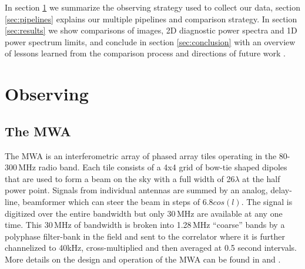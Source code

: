 \documentclass[twolcolumn,iop]{emulateapj}
\begin{document}




In section \ref{sec:observing} we summarize the observing strategy used to collect our data, section \ref{sec:pipelines} explains our multiple pipelines and comparison strategy. In section \ref{sec:results} we show comparisons of images, 2D diagnostic power spectra and 1D power spectrum limits, and conclude in section \ref{sec:conclusion} with an overview of lessons learned from the comparison process and directions of future work .



\section{Observing}
\label{sec:observing}
\subsection{The MWA}
The MWA is an interferometric array of phased array tiles operating in the 80-300\,MHz radio band. Each tile consists of a 4x4 grid of bow-tie shaped dipoles that are used to form a beam on the sky with a full width of 26\arcdeg$\lambda$ at the half power point. Signals from individual antennas are summed by an analog, delay-line, beamformer which can steer the beam in steps of 6.8\arcdeg$cos(l)$.  The signal is digitized over the entire bandwidth but only 30\,MHz are available at any one time.  This 30\,MHz of bandwidth is broken into 1.28\,MHz ``coarse'' bands by a polyphase filter-bank in the field and sent to the correlator \citep{Ord:2015PASA...32....6O} where it is further channelized to 40kHz, cross-multiplied and then averaged at 0.5 second intervals.  More details on the design and operation of the MWA can be found in \cite{Lonsdale:2009p7913} and \cite{Tingay:2013p9022}.

\end{document}
